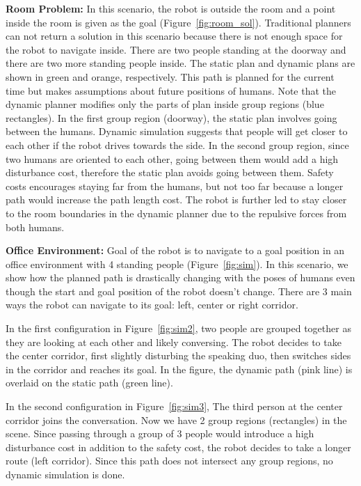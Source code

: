 \textbf{Room Problem: } In this scenario, the robot is outside the room and a point inside the room is given as the goal (Figure~\ref{fig:room_sol}). Traditional planners can not return a solution in this scenario because there is not enough space for the robot to navigate inside. There are two people standing at the doorway and there are two more standing people inside. The static plan and dynamic plans are shown in green and orange, respectively. This path is planned for the current time but makes assumptions about future positions of humans. Note that the dynamic planner modifies only the parts of plan inside group regions (blue rectangles). In the first group region (doorway), the static plan involves going between the humans. Dynamic simulation suggests that people will get closer to each other if the robot drives towards the side. In the second group region, since two humans are oriented to each other, going between them would add a high disturbance cost, therefore the static plan avoids going between them. Safety costs encourages staying far from the humans, but not too far because a longer path would increase the path length cost. The robot is further led to stay closer to the room boundaries in the dynamic planner due to the repulsive forces from both humans.




\textbf{Office Environment: } Goal of the robot is to navigate to a goal position in an office environment with 4 standing people (Figure~\ref{fig:sim}). In this scenario, we show how the planned path is drastically changing with the poses of humans even though the start and goal position of the robot doesn't change. There are 3 main ways the robot can navigate to its goal: left, center or right corridor. 

In the first configuration in Figure~\ref{fig:sim2}, two people are grouped together as they are looking at each other and likely conversing. The robot decides to take the center corridor, first slightly disturbing the speaking duo, then switches sides in the corridor and reaches its goal. In the figure, the dynamic path (pink line) is overlaid on the static path (green line). 

In the second configuration in Figure~\ref{fig:sim3}, The third person at the center corridor joins the conversation. Now we have 2 group regions (rectangles) in the scene. Since passing through a group of 3 people would introduce a high disturbance cost in addition to the safety cost, the robot decides to take a longer route (left corridor). Since this path does not intersect any group regions, no dynamic simulation is done.

